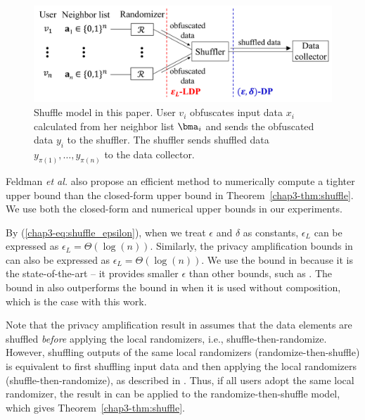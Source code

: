 \begin{figure}[t]
  \centering
  \includegraphics[width=0.99\linewidth]{fig/shuffle.pdf}
  
  \caption{Shuffle model in this paper. 
  User $v_i$ obfuscates input data $x_i$ calculated from her neighbor list $\bma_i$ and sends the obfuscated data $y_i$ to the shuffler. 
  The shuffler sends shuffled data $y_{\pi(1)}, \ldots, y_{\pi(n)}$ to the data collector.
  }
  \label{chap3-fig:shuffle_model}
\end{figure}

Feldman \textit{et al.} \cite{Feldman_FOCS21} also propose an efficient method to numerically compute a tighter upper bound than the closed-form upper bound in Theorem~\ref{chap3-thm:shuffle}. 
We use both the closed-form and numerical upper bounds in our experiments. 

By (\ref{chap3-eq:shuffle_epsilon}), when we treat $\epsilon$ and $\delta$ as constants, $\epsilon_L$ can be expressed as $\epsilon_L = \Theta(\log(n))$. 
Similarly, the privacy amplification bounds in \cite{Balle_CRYPTO19,Cheu_EUROCRYPT19} can also be expressed as $\epsilon_L = \Theta(\log(n))$. 
We use the bound in \cite{Feldman_FOCS21} because it is the state-of-the-art -- it provides smaller $\epsilon$ than other bounds, such as \cite{Balle_CRYPTO19,Cheu_EUROCRYPT19,Erlingsson_SODA19}. 
The bound in \cite{Feldman_FOCS21} also outperforms the bound in \cite{Girgis_CCS21} when it is used without composition, which is the case with this work. 

Note that the privacy amplification result in \cite{Feldman_FOCS21} assumes that the data elements are shuffled \textit{before} applying the local randomizers, i.e., shuffle-then-randomize. 
However, 
shuffling outputs of the same local randomizers (randomize-then-shuffle) 
is equivalent to first shuffling input data and then applying the local randomizers (shuffle-then-randomize), as described in \cite{Erlingsson_SODA19}. 
Thus, if all users adopt the same local randomizer, the result in \cite{Feldman_FOCS21} can be applied to the randomize-then-shuffle model, which gives Theorem~\ref{chap3-thm:shuffle}. 

